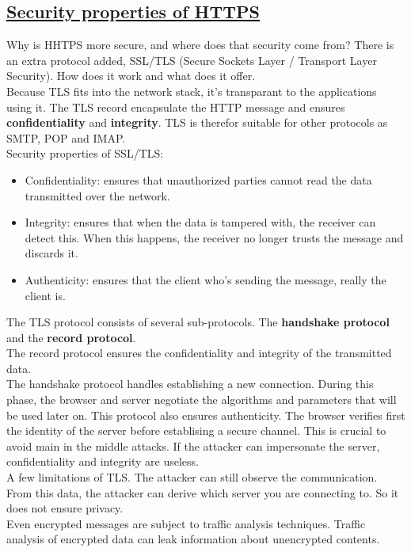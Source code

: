 \documentclass[titlepage]{article}
\begin{document}
    \subsection{\href{https://youtu.be/mPBelbuMsjo}{Security properties of HTTPS}}
    Why is HHTPS more secure, and where does that security come from? There is an extra protocol added, SSL/TLS (Secure Sockets Layer / Transport Layer Security). How does it work and what does it offer.\\
    Because TLS fits into the network stack, it's transparant to the applications using it. The TLS record encapsulate the HTTP message and ensures \textbf{confidentiality} and \textbf{integrity}. TLS is therefor suitable for other protocols as SMTP, POP and IMAP.\\
    Security properties of SSL/TLS:
    \begin{itemize}
        \item Confidentiality: ensures that unauthorized parties cannot read the data transmitted over the network.
        \item Integrity: ensures that when the data is tampered with, the receiver can detect this. When this happens, the receiver no longer trusts the message and discards it.
        \item Authenticity: ensures that the client who's sending the message, really the client is.
    \end{itemize}
    The TLS protocol consists of several sub-protocols. The \textbf{handshake protocol} and the \textbf{record protocol}.\\
    The record protocol ensures the confidentiality and integrity of the transmitted data.\\
    The handshake protocol handles establishing a new connection. During this phase, the browser and server negotiate the algorithms and parameters that will be used later on. This protocol also ensures authenticity. The browser verifies first the identity of the server before establising a secure channel. This is crucial to avoid main in the middle attacks. If the attacker can impersonate the server, confidentiality and integrity are useless.\\
    A few limitations of TLS. The attacker can still observe the communication. From this data, the attacker can derive which server you are connecting to. So it does not ensure privacy.\\
    Even encrypted messages are subject to traffic analysis techniques. Traffic analysis of encrypted data can leak information about unencrypted contents.
\end{document}
